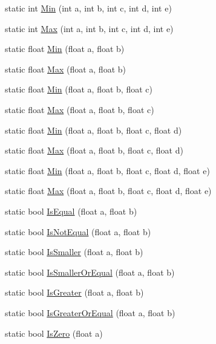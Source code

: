 \begin{DoxyCompactItemize}
\item 
static int \hyperlink{class_math3_d_a885598e246910441df65d02654227ce1}{Min} (int a, int b, int c, int d, int e)
\item 
static int \hyperlink{class_math3_d_a986bb19803ac939a2e78539a8e18219a}{Max} (int a, int b, int c, int d, int e)
\item 
static float \hyperlink{class_math3_d_aeb47c940f3cbf80cb49fc06887186c95}{Min} (float a, float b)
\item 
static float \hyperlink{class_math3_d_a67d01397176f500d92266884c3dc7924}{Max} (float a, float b)
\item 
static float \hyperlink{class_math3_d_a724b2c2b0bfe0f17f4aa3b80d27aa44e}{Min} (float a, float b, float c)
\item 
static float \hyperlink{class_math3_d_a4ab24edda33f9b2c82344e6db21fee71}{Max} (float a, float b, float c)
\item 
static float \hyperlink{class_math3_d_a1fc9c80ebe6e44539db7d2a29d680ae6}{Min} (float a, float b, float c, float d)
\item 
static float \hyperlink{class_math3_d_adc4e3943342c4379efa8aa4bfdaa6ab2}{Max} (float a, float b, float c, float d)
\item 
static float \hyperlink{class_math3_d_a364afba9691dd14bf188747b8a145c8f}{Min} (float a, float b, float c, float d, float e)
\item 
static float \hyperlink{class_math3_d_a15f93e9d13a5ac173cc1b285caba7f20}{Max} (float a, float b, float c, float d, float e)
\item 
static bool \hyperlink{class_math3_d_a1aae2c37e4e15ee733793e7842291553}{Is\+Equal} (float a, float b)
\item 
static bool \hyperlink{class_math3_d_ae499a3f0501f5b894ba15ec138b31eb0}{Is\+Not\+Equal} (float a, float b)
\item 
static bool \hyperlink{class_math3_d_ab29087cdcf78e23f21beb344b33b5cd0}{Is\+Smaller} (float a, float b)
\item 
static bool \hyperlink{class_math3_d_abbfa440db197b623a79d2a427d3c223f}{Is\+Smaller\+Or\+Equal} (float a, float b)
\item 
static bool \hyperlink{class_math3_d_ae769c12564a70338dd781b765c6ca472}{Is\+Greater} (float a, float b)
\item 
static bool \hyperlink{class_math3_d_a016fa2364595e47844da0a464b8d79a3}{Is\+Greater\+Or\+Equal} (float a, float b)
\item 
static bool \hyperlink{class_math3_d_a4d7f253fabba0e99c1442c96b30708d7}{Is\+Zero} (float a)

\end{DoxyCompactItemize}
